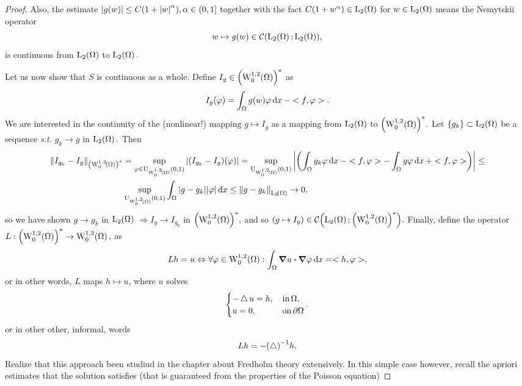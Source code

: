 \documentclass{article}
\begin{document}
\begin{example}
\begin{proof}
		Also, the estimate $\abs{g(w)} \leq C(1+\abs{w}^{\alpha}), \alpha \in (0,1]$ together with the fact $C(1+w^{\alpha}) \in \LpSet[2]{\Omega}$ for $w \in \LpSet[2]{\Omega}$ means the Nemytskii operator
		\[
			w \mapsto g(w) \in \mathcal{C}\qty(\LpSet[2]{\Omega}; \LpSet[2]{\Omega}),
		\]
		is continuous from $\LpSet[2]{\Omega}$ to $\LpSet[2]{\Omega}.$

		Let us now show that $S$ is continuous as a whole. Define $I_g \in \qty(\WkpzeroSet[1][2]{\Omega})^{*}$ as
		\[
			I_g\qty(\varphi) = \int_{\Omega}g(w) \varphi\dd{x} - <f, \varphi>.
		\]
		We are interested in the continuity of the (nonlinear!) mapping $g \mapsto I_g$ as a mapping from $\LpSet[2]{\Omega}$ to $\qty(\WkpzeroSet[1][2]{\Omega})^{*}.$ Let $\qty{g_k} \subset \LpSet[2]{\Omega}$ be a sequence \textit{s.t.} $g_k \to g$ in  $\LpSet[2]{\Omega}.$ Then
		\begin{align*}
			\norm{I_{g_k}- I_g}_{\qty(\WkpzeroSet[1][2]{\Omega})^{*}} &= \sup_{\varphi \in \text{U}_{\WkpzeroSet[1][2]{\Omega}}(0,1)}\abs{\qty(I_{g_k}-I_g)\qty(\varphi)} = \sup_{\text{U}_{\WkpzeroSet[1][2]{\Omega}}(0,1)}\abs{\qty(\int_{\Omega}g_k \varphi\dd{x} - <f,\varphi> - \int_{\Omega}g \varphi\dd{x}+<f,\varphi>)} \leq \\
										  &\sup_{\text{U}_{\WkpzeroSet[1][2]{\Omega}}(0,1)}\int_{\Omega}\abs{g - g_k}|\varphi|\dd{x} \leq \norm{g-g_k}_{\LpSet[2]{\Omega}} \to 0,
		\end{align*}
		so we have shown $g \to g_k$ in $\LpSet[2]{\Omega}$ $\Rightarrow I_g \to I_{g_k}$ in $\qty(\WkpzeroSet[1][2]{\Omega})^{*},$ and so $\qty(g \mapsto I_g) \in \mathcal{C}\qty(\LpSet[2]{\Omega}; \qty(\WkpzeroSet[1][2]{\Omega})^{*}).$ Finally, define the operator $L: \qty(\WkpzeroSet[1][2]{\Omega})^{*} \to \WkpzeroSet[1][2]{\Omega},$ as
		\[
			Lh = u \Leftrightarrow \forall \varphi \in \WkpzeroSet[1][2]{\Omega}: \int_{\Omega}\grad u \vdot \grad \varphi \dd{x} = <h, \varphi>,
		\]
		or in other words, $L$ maps $h \mapsto u$, where $u$ solves
		\[
			\begin{cases}
				-\operatorname{\bigtriangleup} u = h, & \, \text{in} \, \Omega, \\
				u = 0, & \, \text{on} \, \partial \Omega
			\end{cases}.
		\]
		or in other other, informal, words
		\[
			Lh = - \qty(\operatorname{\bigtriangleup})^{-1}h.
		\]
		Realize that this approach been studiud in the chapter about Fredholm theory extensively. In this simple case however, recall the apriori estimates that the solution satisfies (that is guaranteed from the properties of the Poisson equation)

\end{proof}
\end{example}
\end{document}
